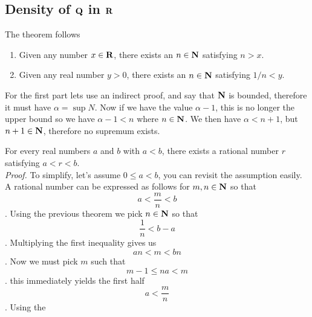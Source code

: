 \subsection{Density of $ \Q $ in $ \R $}
\begin{theorem}
	The theorem follows
	\begin{enumerate}
		\item Given any number $ x \in \textbf{R}$, there exists an $ n \in \textbf{N} $ satisfying $ n > x $. 
		\item Given any real number $ y > 0 $, there exists an $ n \in \textbf{N} $ satisfying $ 1/n < y $.
	\end{enumerate}
	For the first part lets use an indirect proof, and say that $ \textbf{N} $ is bounded, therefore it must have $ \alpha = \sup N $. Now if we have the value $ \alpha - 1 $, this is no longer the upper bound so we have $ \alpha -1 < n $ where $ n \in \textbf{N} $. We then have $ \alpha < n + 1 $, but $ n+1 \in \textbf{N} $, therefore no supremum exists. 
\end{theorem}
\begin{theorem}[Density of $ \Q $ in $ \R $]
	For every real numbers $ a $ and $ b $ with $ a < b $, there exists a rational number $ r $ satisfying $ a < r < b $. \\
	\textit{Proof.} To simplify, let's assume $ 0 \leq a < b $, you can revisit the assumption easily. A rational number can be expressed as follows for $ m, n \in \textbf{N} $ so that \[ a < \dfrac{m}{n} < b\]. Using the previous theorem we pick $ n \in \textbf{N} $ so that \[ \dfrac{1}{n} < b -a \]. Multiplying the first inequality gives us \[ an < m < bn \]. Now we must pick $ m $ such that \[ m -1 \leq na < m \]. this immediately yields the first half \[ a < \dfrac{m}{n} \]. Using the 
\end{theorem}


 



